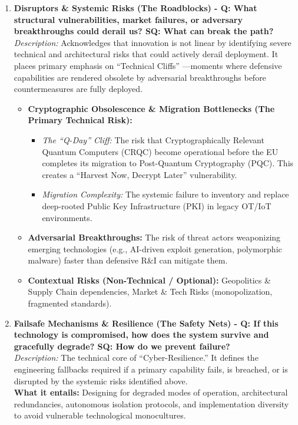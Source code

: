 \documentclass[12pt,a4paper]{article}
\begin{document}
\begin{enumerate}
    \item \textbf{Disruptors \& Systemic Risks (The Roadblocks) - Q: What structural vulnerabilities, market failures, or adversary breakthroughs could derail us? SQ: What can break the path?}\\
    \textit{Description:} Acknowledges that innovation is not linear by identifying severe technical and architectural risks that could actively derail deployment. It places primary emphasis on ``Technical Cliffs'' ---moments where defensive capabilities are rendered obsolete by adversarial breakthroughs before countermeasures are fully deployed.
    \begin{itemize}
        \item \textbf{Cryptographic Obsolescence \& Migration Bottlenecks (The Primary Technical Risk):}
        \begin{itemize}
            \item \textit{The ``Q-Day''  Cliff:} The risk that Cryptographically Relevant Quantum Computers (CRQC) become operational before the EU completes its migration to Post-Quantum Cryptography (PQC). This creates a ``Harvest Now, Decrypt Later''  vulnerability.
            \item \textit{Migration Complexity:} The systemic failure to inventory and replace deep-rooted Public Key Infrastructure (PKI) in legacy OT/IoT environments.
        \end{itemize}
        \item \textbf{Adversarial Breakthroughs:} The risk of threat actors weaponizing emerging technologies (e.g., AI-driven exploit generation, polymorphic malware) faster than defensive R\&I can mitigate them.
        \item \textbf{Contextual Risks (Non-Technical / Optional):} Geopolitics \& Supply Chain dependencies, Market \& Tech Risks (monopolization, fragmented standards).
    \end{itemize}

    \item \textbf{Failsafe Mechanisms \& Resilience (The Safety Nets) - Q: If this technology is compromised, how does the system survive and gracefully degrade? SQ: How do we prevent failure?}\\
    \textit{Description:} The technical core of ``Cyber-Resilience.''  It defines the engineering fallbacks required if a primary capability fails, is breached, or is disrupted by the systemic risks identified above.\\
    \textbf{What it entails:} Designing for degraded modes of operation, architectural redundancies, autonomous isolation protocols, and implementation diversity to avoid vulnerable technological monocultures.


\end{enumerate}
\end{document}
